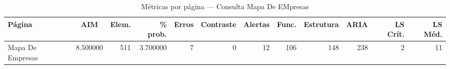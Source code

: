 \begin{table}[htbp]
  \centering
  \caption{Métricas por página — Consulta Mapa De EMpresas}
  \label{tab:flow_consulta_mapa_de_empresas}
  \small
  \begin{tabular}{lcrrrrrrrrrr}
\toprule
Página & AIM & Elem. & \% prob. & Erros & Contraste & Alertas & Func. & Estrutura & ARIA & LS Crít. & LS Méd. \\
\midrule
Mapa De Empresas & 8.500000 & 511 & 3.700000 & 7 & 0 & 12 & 106 & 148 & 238 & 2 & 11 \\
\bottomrule
\end{tabular}
\end{table}
